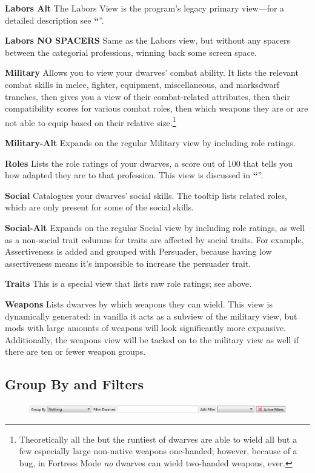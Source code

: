 \documentclass[]{article}
\newcommand{\jump}[1] {\textbf{``\nameref{sec:#1}}''}
\newcommand{\boldlist}[1] {
\vspace{12pt}
\noindent \textbf{#1}
}
\begin{document}
\boldlist{Labors Alt} The Labors View is the program's legacy primary view---for a detailed
description see \jump{Labors View}.


\boldlist{Labors NO SPACERS} Same as the Labors view, but without any spacers between the
categorial professions, winning back some screen space.


\boldlist{Military} Allows you to view your dwarves' combat ability. It lists the relevant combat
skills in melee, fighter, equipment, miscellaneous, and marksdwarf tranches, then gives you a view of
their combat-related attributes,  then their compatibility scores for various combat roles, then which
weapons they are or are not able to equip based on their relative size.\footnote{Theoretically all the
but the runtiest of dwarves are able to wield all but a few especially large non-native weapons
one-handed; however, because of a bug, in Fortress Mode \emph{no} dwarves can wield two-handed weapons,
ever.}


\boldlist{Military-Alt} Expands on the regular Military view by including role ratings.


\boldlist{Roles} Lists the role ratings of your dwarves, a score out of 100 that tells you how
adapted they are to that profession. This view is discussed in \jump{Using Roles---The View Method}.


\boldlist{Social} Catalogues your dwarves' social skills. The tooltip lists related
roles, which are only present for some of the social skills.


\boldlist{Social-Alt} Expands on the regular Social view by including role ratings, as well as a
non-social trait columns for traits are affected by social traits. For example, Assertiveness is added
and grouped with Persuader, because having low assertiveness means it's impossible to increase the
persuader trait.


\boldlist{Traits} This is a special view that lists raw role ratings; see above.


\boldlist{Weapons} Lists dwarves by which weapons they can wield. This view is
dynamically generated: in vanilla it acts as a subview of the military view, but mods with large amounts
of weapons will look significantly more expansive. Additionally, the weapons view will be tacked on to the
military view as well if there are ten or fewer weapon groups.

\subsection{Group By and Filters}
\label{sec:Group By and Filters}
\begin{figure}[h!]
\centering
\includegraphics[width=\linewidth]{Sec1Fig11}
\end{figure}
\end{document}
